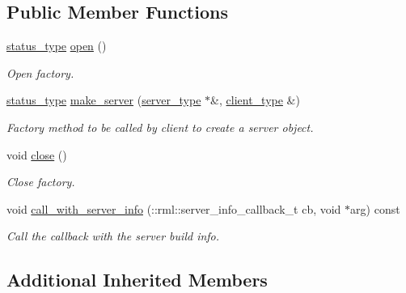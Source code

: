 \subsection*{Public Member Functions}
\begin{DoxyCompactItemize}
\item 
\hyperlink{classrml_1_1factory_a4c1de6c79581a01b37d4ff16340e44c9}{status\+\_\+type} \hyperlink{class____kmp_1_1rml_1_1omp__factory_ae212dc899bfc62e9bf23ad0f99bf0024}{open} ()
\begin{DoxyCompactList}\small\item\em Open factory. \end{DoxyCompactList}\item 
\hyperlink{classrml_1_1factory_a4c1de6c79581a01b37d4ff16340e44c9}{status\+\_\+type} \hyperlink{class____kmp_1_1rml_1_1omp__factory_a68dfe871a7ea8da28614e4d1f8b7f0aa}{make\+\_\+server} (\hyperlink{class____kmp_1_1rml_1_1omp__server}{server\+\_\+type} $\ast$\&, \hyperlink{class____kmp_1_1rml_1_1omp__client}{client\+\_\+type} \&)
\begin{DoxyCompactList}\small\item\em Factory method to be called by client to create a server object. \end{DoxyCompactList}\item 
\hypertarget{class____kmp_1_1rml_1_1omp__factory_ac5cd7885c15546edcbbbfe05dd14c283}{}void \hyperlink{class____kmp_1_1rml_1_1omp__factory_ac5cd7885c15546edcbbbfe05dd14c283}{close} ()\label{class____kmp_1_1rml_1_1omp__factory_ac5cd7885c15546edcbbbfe05dd14c283}

\begin{DoxyCompactList}\small\item\em Close factory. \end{DoxyCompactList}\item 
\hypertarget{class____kmp_1_1rml_1_1omp__factory_acddd8c7abc59f3de281a39c3b5a9baec}{}void \hyperlink{class____kmp_1_1rml_1_1omp__factory_acddd8c7abc59f3de281a39c3b5a9baec}{call\+\_\+with\+\_\+server\+\_\+info} (\+::rml\+::server\+\_\+info\+\_\+callback\+\_\+t cb, void $\ast$arg) const \label{class____kmp_1_1rml_1_1omp__factory_acddd8c7abc59f3de281a39c3b5a9baec}

\begin{DoxyCompactList}\small\item\em Call the callback with the server build info. \end{DoxyCompactList}\end{DoxyCompactItemize}
\subsection*{Additional Inherited Members}


